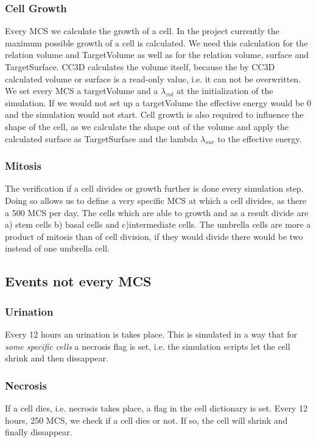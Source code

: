 \subsubsection{Cell Growth}
Every \ac{MCS} we calculate the growth of a cell. In the project currently the maximum possible growth of a cell is calculated.  We need this calculation for the relation volume and TargetVolume as well as for the relation volume, surface and TargetSurface. \ac{CC3D} calculates the volume itself, because the by \ac{CC3D} calculated volume or surface is a read-only value, i.e. it can not be overwritten. We set every \ac{MCS} a targetVolume and a $\lambda_{vol}$ at the initialization of the simulation. If we would not set up a targetVolume the effective energy would be 0 and the simulation would not start. Cell growth is also required to influence the shape of the cell, as we calculate the shape out of the volume and apply the calculated surface as TargetSurface and the lambda $\lambda_{sur}$ to the effective energy.

\subsubsection{Mitosis}
The verification if a cell divides or growth further is done every simulation step. Doing so allows us to define a very specific \ac{MCS} at which a cell divides, as there a 500 \ac{MCS} per day. The cells which are able to growth and as a result divide are a) stem cells b) basal cells and c)intermediate cells. The umbrella cells are more a product of mitosis than of cell division, if they would divide there would be two instead of one umbrella cell.

\subsection{Events not every \ac{MCS}}
\subsubsection{Urination}
Every 12 hours an urination is takes place. This is simulated in a way that for \textit{some specific cells} a necrosis flag is set, i.e. the simulation scripts let the cell shrink and then dissappear.

\subsubsection{Necrosis}
If a cell dies, i.e. necrosis takes place, a flag in the cell dictionary is set. Every 12 hours, 250 \ac{MCS}, we check if a cell dies or not. If so, the cell will shrink and finally dissappear.


